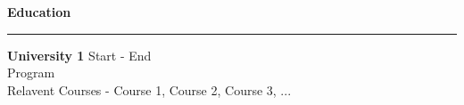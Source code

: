 

\textbf{Education}

\par\noindent\rule{\textwidth}{0.2pt}


\textbf{University 1} \hfill {Start - End} \\
{Program} \\
{Relavent Courses} - {Course 1, Course 2, Course 3, ...} \\

